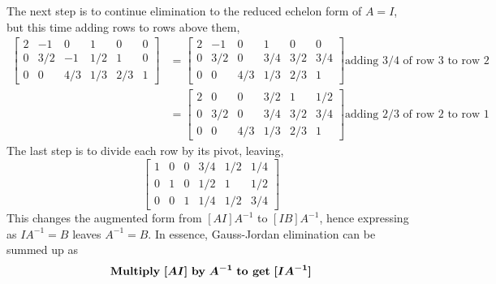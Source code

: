             The next step is to continue elimination to the reduced echelon form of \(A=I\), but this time adding rows
            to rows above them,
            \begin{equation}
                \begin{split}
                    \begin{bmatrix}
                        2  & -1 & 0  & 1 & 0 & 0 \\
                        0 & 3/2 & -1 & 1/2 & 1 & 0 \\ 
                        0  & 0 & 4/3 & 1/3 & 2/3 & 1
                    \end{bmatrix}
                    &=
                    \begin{bmatrix}
                        2  & -1 & 0  & 1 & 0 & 0 \\
                        0 & 3/2 & 0 & 3/4 & 3/2 & 3/4 \\ 
                        0  & 0 & 4/3 & 1/3 & 2/3 & 1
                    \end{bmatrix}
                    \textrm{adding \(3/4\) of row 3 to row 2} \\
                    &=
                    \begin{bmatrix}
                        2 & 0 & 0 & 3/2 & 1 & 1/2 \\
                        0 & 3/2 & 0 & 3/4 & 3/2 & 3/4 \\ 
                        0  & 0 & 4/3 & 1/3 & 2/3 & 1
                    \end{bmatrix}
                    \textrm{adding \(2/3\) of row 2 to row 1}
                \end{split}
            \end{equation}
            The last step is to divide each row by its pivot, leaving,
            \begin{equation}
                \begin{bmatrix}
                    1 & 0 & 0 & 3/4 & 1/2 & 1/4 \\
                    0 & 1 & 0 & 1/2 & 1 & 1/2 \\ 
                    0  & 0 & 1 & 1/4 & 1/2 & 3/4
                \end{bmatrix}
            \end{equation}
            This changes the augmented form from \([AI] A^{-1}\) to \([IB] A^{-1}\), hence expressing as 
            \(IA^{-1}=B\) leaves \(A^{-1}=B\). In essence, Gauss-Jordan elimination can be summed up as
            \begin{equation}
                \textrm{\textbf{Multiply}} \ \boldsymbol{[AI]} \ \textrm{\textbf{by}} \ \boldsymbol{A^{-1}} 
                \ \textrm{\textbf{to get}} \ \boldsymbol{[IA^{-1}]}
            \end{equation}

